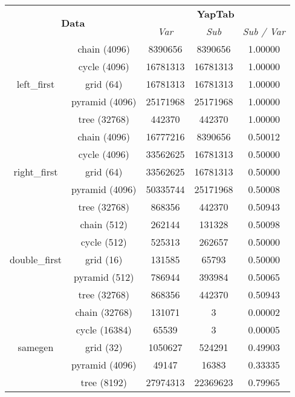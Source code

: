 \begin{table}[ht]
\centering
\small{
  \begin{tabular}{cc|ccc}
   \hline
    \hline
    \multicolumn{2}{c|}{\multirow{2}{*}{\normalsize{\textbf{Data}}}} & \multicolumn{3}{c}{\normalsize{\textbf{YapTab}}} \\
     \multicolumn{2}{c|}{} & \textit{\small{Var}} & \textit{\small{Sub}} & \textit{\small{Sub / Var}} \\
   \hline
   \hline
   
   \multirow{5}{*}{left\_first} &  \footnotesize{chain (4096)} &  8390656 & 8390656 &  1.00000 \\
   &  \footnotesize{cycle (4096)} &  16781313 & 16781313 &  1.00000 \\
   &  \footnotesize{grid (64)} &  16781313 & 16781313 &  1.00000 \\
   &  \footnotesize{pyramid (4096)} &  25171968 & 25171968 &  1.00000 \\
   &  \footnotesize{tree (32768)} &  442370 & 442370 &  1.00000 \\
   \hline

   \multirow{5}{*}{right\_first} &  \footnotesize{chain (4096)} &  16777216 & 8390656 &  0.50012 \\
   &  \footnotesize{cycle (4096)} &  33562625 & 16781313 &  0.50000 \\
   &  \footnotesize{grid (64)} &  33562625 & 16781313 &  0.50000 \\
   &  \footnotesize{pyramid (4096)} &  50335744 & 25171968 &  0.50008 \\
   &  \footnotesize{tree (32768)} &  868356 & 442370 &  0.50943 \\
   \hline
   
   \multirow{5}{*}{double\_first} &  \footnotesize{chain (512)} &  262144 & 131328 &  0.50098 \\
   &  \footnotesize{cycle (512)} &  525313 & 262657 &  0.50000 \\
   &  \footnotesize{grid (16)} &  131585 & 65793 &  0.50000 \\
   &  \footnotesize{pyramid (512)} &  786944 & 393984 &  0.50065 \\
   &  \footnotesize{tree (32768)} &  868356 & 442370 &  0.50943 \\
   \hline
   
   \multirow{5}{*}{samegen} &  \footnotesize{chain (32768)} &  131071 & 3 &  0.00002 \\
   &  \footnotesize{cycle (16384)} &  65539 & 3 &  0.00005 \\
   &  \footnotesize{grid (32)} &  1050627 & 524291 &  0.49903 \\
   &  \footnotesize{pyramid (4096)} &  49147 & 16383 &  0.33335 \\
   &  \footnotesize{tree (8192)} &  27974313 & 22369623 &  0.79965 \\
   \hline
   

\end{tabular}}
\end{table}
